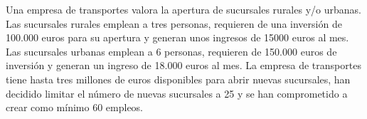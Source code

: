 \documentclass[addpoints,spanish, 12pt,a4paper]{exam}
\begin{document}
\begin{questions}









\question Una empresa de transportes valora la apertura de sucursales rurales y/o urbanas. Las
sucursales rurales emplean a tres personas, requieren de una inversión de 100.000 euros para su apertura y
generan unos ingresos de 15000 euros al mes. Las sucursales urbanas emplean a 6 personas, requieren de
150.000 euros de inversión y generan un ingreso de 18.000 euros al mes. La empresa de transportes tiene
hasta tres millones de euros disponibles para abrir nuevas sucursales, han decidido limitar el número de
nuevas sucursales a 25 y se han comprometido a crear como mínimo 60 empleos.
\begin{parts}

\end{parts}
\end{questions}
\end{document}
